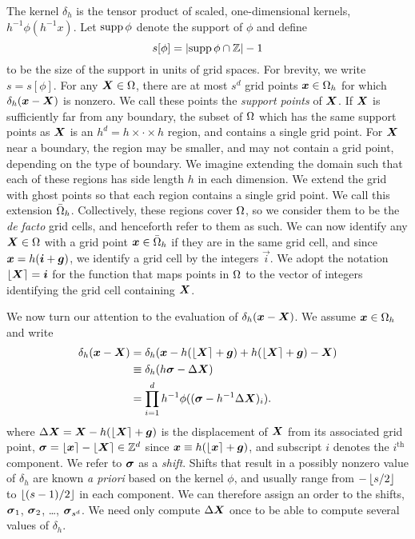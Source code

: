 The kernel $\delta_h$ is the tensor product of scaled, one-dimensional
kernels, $h^{-1}\phi(h^{-1}x)$. Let $\mathrm{supp}\mskip\thinmuskip\phi$
denote the support of $\phi$ and define
\begin{equation}
    s[\phi] = |\mathrm{supp}\mskip\thinmuskip\phi\cap\mathbb{Z}|-1
\end{equation}
to be the size of the support in units of grid spaces. For brevity, we write
$s=s[\phi]$.  For any $\boldsymbol{X}\in\Omega$, there are at most $s^d$ grid points
$\boldsymbol{x}\in\Omega_h$ for which $\delta_h(\boldsymbol{x}-\boldsymbol{X})$ is nonzero. We call these points
the \emph{support points} of $\boldsymbol{X}$. If $\boldsymbol{X}$ is sufficiently far from any
boundary, the subset of $\Omega$ which has the same support points as $\boldsymbol{X}$ is
an $h^d = h\times\cdot\times h$ region, and contains a single grid point. For
$\boldsymbol{X}$ near a boundary, the region may be smaller, and may not contain a grid
point, depending on the type of boundary. We imagine extending the domain such
that each of these regions has side length $h$ in each dimension. We extend the
grid with ghost points so that each region contains a single grid point. We
call this extension $\bar{\Omega}_h$. Collectively, these regions cover
$\Omega$, so we consider them to be the \emph{de facto} grid cells, and
henceforth refer to them as such. We can now identify any $\boldsymbol{X}\in\Omega$ with a
grid point $\boldsymbol{x}\in\bar{\Omega}_h$ if they are in the same grid cell, and since
$\boldsymbol{x}=h(\boldsymbol{i}+\boldsymbol{g})$, we identify a grid cell by the integers $\vec{i}$. We
adopt the notation $\left\lfloor{\boldsymbol{X}}\right\rceil=\boldsymbol{i}$ for the function that maps points in
$\Omega$ to the vector of integers identifying the grid cell containing $\boldsymbol{X}$.

We now turn our attention to the evaluation of $\delta_h(\boldsymbol{x}-\boldsymbol{X})$. We assume
$\boldsymbol{x}\in\Omega_h$ and write
\begin{equation}
    \label{eq:delta-defs}
    \begin{aligned}
        \delta_h(\boldsymbol{x}-\boldsymbol{X})
        &= \delta_h(\boldsymbol{x}-h(\left\lfloor{\boldsymbol{X}}\right\rceil+\boldsymbol{g}) + h(\left\lfloor{\boldsymbol{X}}\right\rceil+\boldsymbol{g}) - \boldsymbol{X}) \\
        &\equiv \delta_h(h\boldsymbol{\sigma} - \Delta\boldsymbol{X}) \\
        &= \prod_{i=1}^d h^{-1}\phi((\boldsymbol{\sigma} - h^{-1}\Delta\boldsymbol{X})_i).
    \end{aligned}
\end{equation}
where $\Delta\boldsymbol{X} = \boldsymbol{X}-h(\left\lfloor{\boldsymbol{X}}\right\rceil+\boldsymbol{g})$ is the displacement of $\boldsymbol{X}$ from its
associated grid point, $\boldsymbol{\sigma} = \left\lfloor{\boldsymbol{x}}\right\rceil-\left\lfloor{\boldsymbol{X}}\right\rceil\in\mathbb{Z}^d$ since
$\boldsymbol{x} \equiv h(\left\lfloor{\boldsymbol{x}}\right\rceil+\boldsymbol{g})$, and subscript $i$ denotes the $i^\text{th}$
component. We refer to $\boldsymbol{\sigma}$ as a \emph{shift}. Shifts that result in
a possibly nonzero value of $\delta_h$ are known \emph{a priori} based on the
kernel $\phi$, and usually range from $-\left\lfloor{s/2}\right\rfloor$ to $\left\lfloor{(s-1)/2}\right\rfloor$ in
each component. We can therefore assign an order to the shifts, $\boldsymbol{\sigma}_1$,
$\boldsymbol{\sigma}_2$, \dots, $\boldsymbol{\sigma}_{s^d}$. We need only compute $\Delta\boldsymbol{X}$ once to be
able to compute several values of $\delta_h$.

